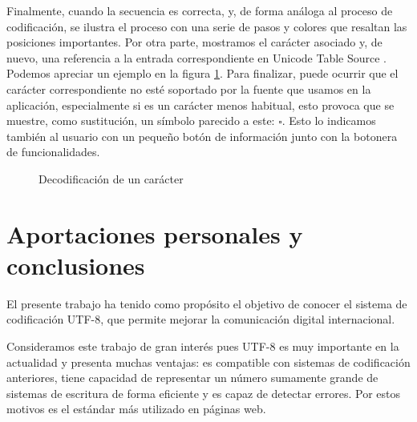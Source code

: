 \documentclass{article}
\begin{document}
Finalmente, cuando la secuencia es correcta, y, de forma análoga al proceso de
codificación, se ilustra el proceso con una serie de pasos y colores que resaltan
las posiciones importantes. Por otra parte, mostramos el carácter asociado y, de
nuevo, una referencia a la entrada correspondiente en Unicode Table Source
\cite{unicode-table-source}. Podemos apreciar un ejemplo en la figura
\ref{fig:decodificacion-ejemplo-ok}. Para finalizar, puede ocurrir que el
carácter correspondiente no esté soportado por la fuente que usamos en la
aplicación, especialmente si es un carácter menos habitual, esto provoca que se
muestre, como sustitución, un símbolo parecido a este: $\square$. Esto lo indicamos
también al usuario con un pequeño botón de información junto con la botonera de
funcionalidades.

\begin{figure}[h!]
  \centering
  \caption{Decodificación de un carácter}
  \label{fig:decodificacion-ejemplo-ok}
\end{figure}

\newpage
\section{Aportaciones personales y conclusiones}

El presente trabajo ha tenido como propósito el objetivo de conocer el sistema
de codificación UTF-8, que permite mejorar la comunicación digital
internacional.

Consideramos este trabajo de gran interés pues UTF-8 es muy importante en la
actualidad y presenta muchas ventajas: es compatible con sistemas de
codificación anteriores, tiene capacidad de representar un número sumamente
grande de sistemas de escritura de forma eficiente y es capaz de detectar
errores. Por estos motivos es el estándar más utilizado en páginas web.
\end{document}
